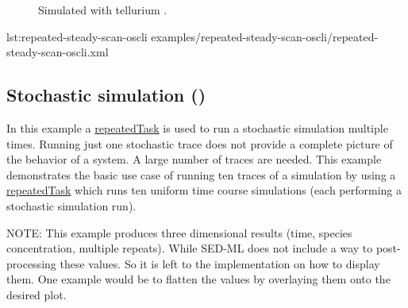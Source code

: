 \begin{figure}[ht]
\begin{minipage}{0.47\textwidth}
        \caption{Simulated with tellurium \citep{tellurium}.}
    \end{minipage}
    \label{fig:repeated-steady-scan-oscli}
\end{figure}

{lst:repeated-steady-scan-oscli}
{examples/repeated-steady-scan-oscli/repeated-steady-scan-oscli.xml}


\subsection{Stochastic simulation ()}
In this example a \hyperref[class:repeatedTask]{repeatedTask} is used to run a stochastic simulation multiple times.
Running just one stochastic trace does not provide a complete picture of the behavior of a system. A large number of traces are needed. This example demonstrates the basic use case of running ten traces of a simulation by using a \hyperref[class:repeatedTask]{repeatedTask} which runs ten uniform time course simulations (each performing a stochastic simulation run).

NOTE: This example produces three dimensional results (time, species concentration, multiple repeats). While SED-ML \currentLV does not include a way to post-processing these values. So it is left to the implementation on how to display them. One example would be to flatten the values by overlaying them onto the desired plot. 

